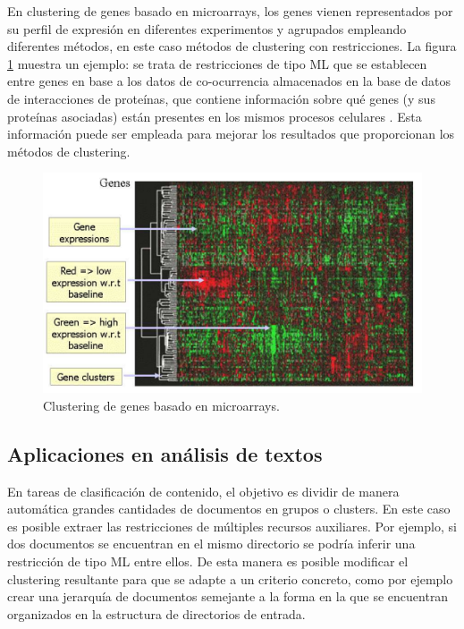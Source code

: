 En clustering de genes basado en microarrays, los genes vienen representados por su perfil de expresión en diferentes experimentos y agrupados empleando diferentes métodos, en este caso métodos de clustering con restricciones. La  figura \ref{fig:figure13} muestra un ejemplo: se trata de restricciones de tipo \acf{ML} que se establecen entre genes en base a los datos de co-ocurrencia almacenados en la base de datos de interacciones de proteínas, que contiene información sobre qué genes (y sus proteínas asociadas) están presentes en los mismos procesos celulares \cite{Xenarios:2001}. Esta información puede ser empleada para mejorar los resultados que proporcionan los métodos de clustering. \cite{Seagal:2003}

\begin{figure}[!h]
	\centering
	\includegraphics[scale=0.3]{imagenes/c3/Genetica/Genes} 
	\caption[Clustering de genes basado en microarrays.]{Clustering de genes basado en microarrays. \cite{Survey:2007}}\label{fig:figure13}
\end{figure}

\subsection{Aplicaciones en análisis de textos}

En tareas de clasificación de contenido, el objetivo es dividir de manera automática grandes cantidades de documentos en grupos o clusters. En este caso es posible extraer las restricciones de múltiples recursos auxiliares. Por ejemplo, si dos documentos se encuentran en el mismo directorio se podría inferir una restricción de tipo \acf{ML} entre ellos. De esta manera es posible modificar el clustering resultante para que se adapte a un criterio concreto, como por ejemplo crear una jerarquía de documentos semejante a la forma en la que se encuentran organizados en la estructura de directorios de entrada.

